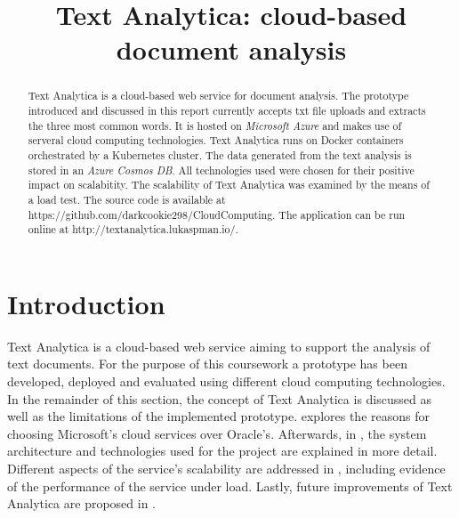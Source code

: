 \documentclass[conference]{IEEEtran}
\begin{document}
\title{Text Analytica: cloud-based document analysis\\}

\author{
\and
{}
}

\maketitle

\begin{abstract}
Text Analytica is a cloud-based web service for document analysis. The prototype introduced and discussed in this report currently accepts txt file uploads and extracts the three most common words. It is hosted on \textit{Microsoft Azure} and makes use of serveral cloud computing technologies. Text Analytica runs on Docker containers orchestrated by a Kubernetes cluster. The data generated from the text analysis is stored in an \textit{Azure Cosmos DB}. All technologies used were chosen for their positive impact on scalabitity. The scalability of Text Analytica was examined by the means of a load test. The source code is available at https://github.com/darkcookie298/CloudComputing. The application can be run online at http://textanalytica.lukaspman.io/.
\end{abstract}

\section{Introduction}
\label{sec:intro}
Text Analytica is a cloud-based web service aiming to support the analysis of text documents. For the purpose of this coursework a prototype has been developed, deployed and evaluated using different cloud computing technologies. In the remainder of this section, the concept of Text Analytica is discussed as well as the limitations of the implemented prototype.  explores the reasons for choosing Microsoft's cloud services over Oracle's. Afterwards, in , the system architecture and technologies used for the project are explained in more detail. Different aspects of the service's scalability are addressed in , including evidence of the performance of the service under load. Lastly, future improvements of Text Analytica are proposed in .
\end{document}
